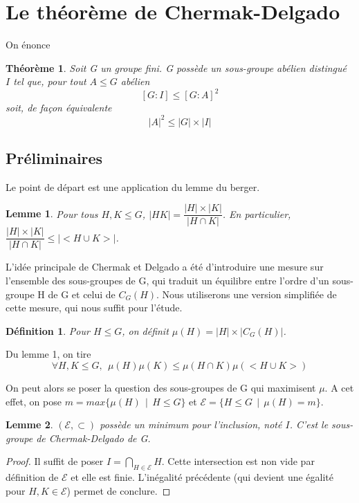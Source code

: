 \documentclass[10pt,a4paper]{article}
\newtheorem{theorem}{Théorème}
\newtheorem{lemma}{Lemme}
\newtheorem{definition}{Définition}
\begin{document}
\section{Le théorème de Chermak-Delgado}
On énonce

\begin{theorem}
Soit G un groupe fini. G possède un sous-groupe abélien distingué $I$ tel que, pour tout $A \leq G$ abélien $$[G:I] \leq [G:A]^{2}$$ soit, de façon équivalente $$|A|^{2} \leq |G|\times |I|$$
\end{theorem}
\subsection{Préliminaires}
Le point de départ est une application du lemme du berger.
\begin{lemma}
Pour tous $H,K \leq G$, $|HK| = \dfrac{|H| \times |K|}{|H \cap K|}$. 
\smallbreak
En particulier,$\dfrac{|H| \times |K|}{|H \cap K|} \leq |<H \cup K>|$.  
\end{lemma}
L'idée principale de Chermak et Delgado a été d'introduire une mesure sur l'ensemble des sous-groupes de G, qui traduit un équilibre entre l'ordre d'un sous-groupe H de G et celui de $C_{G}(H)$. Nous utiliserons une version simplifiée de cette mesure, qui nous suffit pour l'étude. 
\begin{definition}
Pour $H \leq G$, on définit $\mu (H) = |H| \times |C_{G}(H)|$.
\end{definition}
Du lemme 1, on tire $$ \forall H,K \leq G,\:\: \mu (H) \mu (K) \leq \mu (H \cap K) \mu (<H \cup K>)$$

On peut alors se poser la question des sous-groupes de G qui maximisent $\mu$. A cet effet, on pose $m=max\{ \mu (H)\:\:|\:\: H \leq G\}$ et $\mathcal{E} = \{ H \leq G \:\:|\:\: \mu (H) = m \}$.
\begin{lemma}
$(\mathcal{E} , \subset )$ possède un minimum pour l'inclusion, noté $I$. C'est le sous-groupe de Chermak-Delgado de G.
\end{lemma}
\begin{proof}
Il suffit de poser $I=\bigcap_{H \in \mathcal{E}}H$. Cette intersection est non vide par définition de $\mathcal{E}$ et elle est finie. L'inégalité précédente (qui devient une égalité pour $H,K \in \mathcal{E}$) permet de conclure.
\end{proof}
\end{document}
